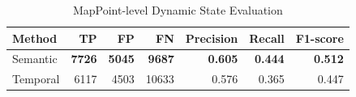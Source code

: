 \begin{table}[t]
  \centering
  \caption{MapPoint-level Dynamic State Evaluation}
  \label{tab:p4_mappoint_level}
  \begin{tabular}{lrrrrrr}
    \hline
    Method & TP & FP & FN & Precision & Recall & F1-score \\
    \hline
    Semantic & \textbf{7726} & \textbf{5045} & \textbf{9687} & \textbf{0.605} & \textbf{0.444} & \textbf{0.512} \\
    Temporal & 6117 & 4503 & 10633 & 0.576 & 0.365 & 0.447 \\
    \hline
  \end{tabular}
\end{table}
